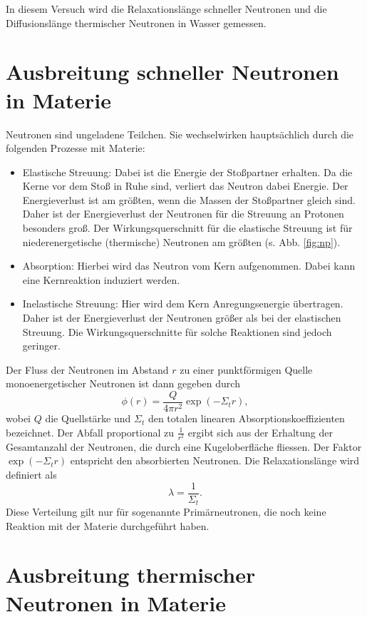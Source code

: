 In diesem Versuch wird die Relaxationslänge schneller Neutronen und die Diffusionslänge thermischer Neutronen in Wasser gemessen.

\section{Ausbreitung schneller Neutronen in Materie}

Neutronen sind ungeladene Teilchen. Sie wechselwirken hauptsächlich durch die folgenden Prozesse mit Materie:
\begin{itemize}
 \item Elastische Streuung: Dabei ist die Energie der Stoßpartner erhalten. Da die Kerne vor dem Stoß in Ruhe sind, verliert das Neutron dabei Energie. Der Energieverlust ist am größten, wenn die Massen der Stoßpartner gleich sind. Daher ist der Energieverlust der Neutronen für die Streuung an Protonen besonders groß.
	Der Wirkungsquerschnitt für die elastische Streuung ist für niederenergetische (thermische) Neutronen am größten (s. Abb. \ref{fig:np}).
 \item Absorption: Hierbei wird das Neutron vom Kern aufgenommen. Dabei kann eine Kernreaktion induziert werden.
 \item Inelastische Streuung: Hier wird dem Kern Anregungsenergie übertragen. Daher ist der Energieverlust der Neutronen größer als bei der elastischen Streuung. Die Wirkungsquerschnitte für solche Reaktionen sind jedoch geringer.
\end{itemize}

Der Fluss der Neutronen im Abstand $r$ zu einer punktförmigen Quelle monoenergetischer Neutronen ist dann gegeben durch \cite{BB}
\begin{equation}
 \phi(r) = \frac{Q}{4\pi r^{2}}\exp\left( -\Sigma_{t}r\right),
\end{equation}
wobei $Q$ die Quellstärke und $\Sigma_{t}$ den totalen linearen Absorptionskoeffizienten bezeichnet. Der Abfall proportional zu $\frac{1}{r^{2}}$ ergibt sich aus der Erhaltung der Gesamtanzahl der Neutronen, die durch eine Kugeloberfläche fliessen.
Der Faktor $\exp\left( -\Sigma_{t}r\right)$ entspricht den absorbierten Neutronen. Die Relaxationslänge wird definiert als
\begin{equation}
 \lambda = \frac{1}{\Sigma_{t}}.
\end{equation}
Diese Verteilung gilt nur für sogenannte Primärneutronen, die noch keine Reaktion mit der Materie durchgeführt haben.

\section{Ausbreitung thermischer Neutronen in Materie}

